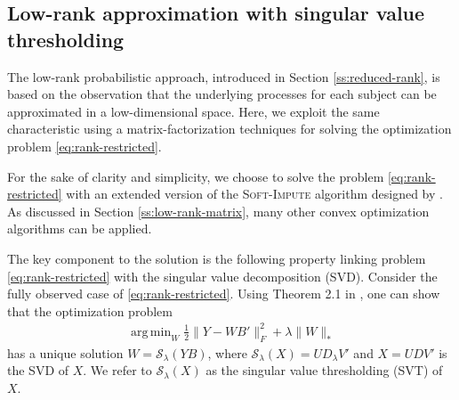 \documentclass[preprint]{imsart}
\numberwithin{equation}{section}
\theoremstyle{plain}
\newcommand{\cS}{\mathcal{S}}
\DeclareMathOperator*{\argmin}{arg\,min}
\begin{document}
\subsection{Low-rank approximation with singular value thresholding}\label{ss:matrix-factorization}

The low-rank probabilistic approach, introduced in Section \ref{ss:reduced-rank}, is based on the observation that the underlying processes for each subject can be approximated in a low-dimensional space. %
Here, we exploit the same characteristic using a matrix-factorization techniques for solving the optimization problem \eqref{eq:rank-restricted}.


For the sake of clarity and simplicity, we choose to solve the problem \eqref{eq:rank-restricted} with an extended version of the \textsc{Soft-Impute} algorithm designed by \citet{mazumder2010spectral}. As discussed in Section \ref{ss:low-rank-matrix}, many other convex optimization algorithms can be applied.

The key component to the solution is the following property linking problem \eqref{eq:rank-restricted} with the singular value decomposition (SVD). Consider the fully observed case of \eqref{eq:rank-restricted}. Using Theorem 2.1 in \citet{cai2010singular}, one can show that the optimization problem
\begin{align}\label{eq:optsvd}
\argmin_{W} \frac{1}{2} \| Y - WB' \|_F^2 + \lambda\|W\|_*
\end{align}
has a unique solution $W = \cS_\lambda (YB)$, where $\cS_\lambda(X) = UD_\lambda V'$ and $X = UDV'$ is the SVD of $X$. We refer to $\cS_\lambda(X)$ as the singular value thresholding (SVT) of $X$.
\end{document}

